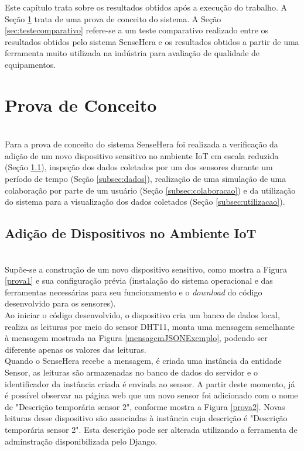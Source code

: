 
\quad Este capítulo trata sobre os resultados obtidos após a execução do trabalho. A Seção \ref{sec:provadeconceito} trata de uma prova de conceito do sistema. A Seção \ref{sec:testecomparativo} refere-se a um teste comparativo realizado entre os resultados obtidos pelo sistema SenseHera e os resultados obtidos a partir de uma ferramenta muito utilizada na indústria para avaliação de qualidade de equipamentos.
%
\section{Prova de Conceito}
\label{sec:provadeconceito}
\\\null \quad Para a prova de conceito do sistema SenseHera foi realizada a verificação da adição de um novo dispositivo sensitivo no ambiente \acrshort{IoT} em escala reduzida (Seção \ref{subsec:dispositivo}), inspeção dos dados coletados por um dos sensores durante um período de tempo (Seção \ref{subsec:dados}), realização de uma simulação de uma colaboração por parte de um usuário (Seção \ref{subsec:colaboracao}) e da utilização do sistema para a visualização dos dados coletados (Seção \ref{subsec:utilizacao}).

\subsection{Adição de Dispositivos no Ambiente IoT}
\label{subsec:dispositivo}
\\\null \quad Supõe-se a construção de um novo dispositivo sensitivo, como mostra a Figura \ref{prova1} e sua configuração prévia (instalação do sistema operacional e das ferramentas necessárias para seu funcionamento e o \textit{download} do código desenvolvido para os sensores).
\pagebreak
{}
\\\null \quad Ao iniciar o código desenvolvido, o dispositivo cria um banco de dados local, realiza as leituras por meio do sensor DHT11, monta uma mensagem semelhante à mensagem mostrada na Figura \ref{mensagemJSONExemplo}, podendo ser diferente apenas os valores das leituras.
\\\null \quad Quando o SenseHera recebe a mensagem, é criada uma instância da entidade Sensor, as leituras são armazenadas no banco de dados do servidor e o identificador da instância criada é enviada ao sensor. A partir deste momento, já é possível observar na página web que um novo sensor foi adicionado com o nome de "Descrição temporária sensor 2", conforme mostra a Figura \ref{prova2}. Novas leituras desse dispositivo são associadas à instância cuja descrição é "Descrição temporária sensor 2". Esta descrição pode ser alterada utilizando a ferramenta de adminstração disponibilizada pelo Django.
\pagebreak
{}

